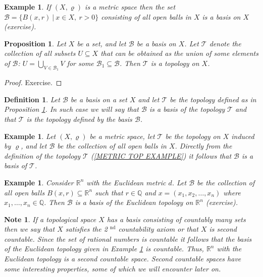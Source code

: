 \documentclass[11pt, letterpaper, oneside]{report}
\theoremstyle{pplain}
\newtheorem{proposition}[theorem]{Proposition}
\newtheorem{ITERMVALUE THM}[theorem]{Intermediate Value Theorem}
\newtheorem{HEINEBOREL THM}[theorem]{Heine-Borel Theorem}
\newtheorem{UMETR THM}[theorem]{Urysohn Metrization Theorem}
\newtheorem{UMETR2 THM}[theorem]{Urysohn Metrization Theorem (v.2)}
\theoremstyle{ddefinition}
\newtheorem{definition}[theorem]{Definition}
\newtheorem{example}[theorem]{Example}
\newtheorem{note}[theorem]{Note}
\theoremstyle{nnn}
\newtheorem{TDA NN}[theorem]{Topological Data Analysis. }
\theoremstyle{eexercise}
\newcommand{\Q}{{\mathbb Q}}
\newcommand{\R}{{\mathbb R}}
\newcommand{\BB}{{\mathcal B}}
\newcommand{\TT}{{\mathcal T}}
\begin{document}
\begin{example}
If $(X, \varrho)$ is a metric space then the set 
$\BB = \{ B(x, r) \ | \ x\in X, \ r>0\}$
consisting of all open balls in $X$ is a basis on $X$ (exercise).
\end{example}


\begin{proposition}
\label{TOP BASIS PROP}
Let $X$ be a set, and  let  $\BB$ be  a basis on $X$. Let $\TT$ 
denote  the collection of all subsets $U\subseteq X$ that can be obtained as the union of some 
elements of $\BB$:
$U= \bigcup_{V\in \BB_{1}}V$
for some $\BB_{1}\subseteq \BB$. Then $\TT$ is a topology on $X$. 
\end{proposition}

\begin{proof}
Exercise. 
\end{proof}


\begin{definition}
Let $\BB$ be a basis on a set $X$ and let $\TT$ be the topology defined as in 
Proposition \ref{TOP BASIS PROP}. In such case we will say that $\BB$ is a \emph{basis 
of the topology} $\TT$ and that $\TT$ is the \emph{topology defined by the basis} $\BB$.  
\end{definition}


\begin{example}
Let $(X, \varrho)$ be a metric space, let $\TT$ be the topology on $X$ induced by 
$\varrho$, and let $\BB$ be the collection of all open balls in $X$. Directly from the definition of 
the topology $\TT$ (\ref{METRIC TOP EXAMPLE}) it follows that $\BB$  is a basis 
of $\TT$.   
\end{example}

\begin{example}
\label{COUNTABLE RN BASIS EX}
Consider  $\R^{n}$ with the Euclidean metric $d$. Let $\BB$ be the collection of all open 
balls $B(x, r)\subseteq \R^{n}$ such that $r\in \Q$ and $x=(x_{1}, x_{2}, \dots, x_{n})$ where 
$x_{1}, \dots, x_{n}\in \Q$. Then $\BB$ is a basis of the Euclidean topology on $\R^{n}$ (exercise). 

\end{example}

\begin{note}
If  a topological space $X$ has a  basis consisting of countably many sets then we say that $X$ satisfies 
the \emph{2 $\!^{\text{nd}}$  countability axiom} or that $X$ is  \emph{second countable}. 
Since the set of rational numbers is countable it follows that the basis of the Euclidean topology 
given in Example \ref{COUNTABLE RN BASIS EX} is countable. Thus, $\R^{n}$ with the Euclidean topology 
is a second countable space. Second countable spaces have some interesting properties, some of which we will 
encounter later on. 
\end{note}
\end{document}
